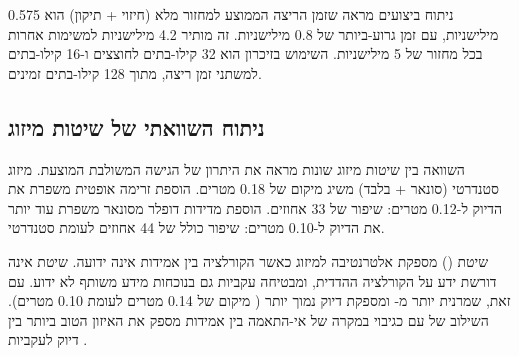 ניתוח ביצועים מראה שזמן הריצה הממוצע למחזור  מלא (חיזוי + תיקון) הוא 0.575 מילישניות, עם זמן גרוע-ביותר של 0.8 מילישניות. זה מותיר 4.2 מילישניות למשימות אחרות בכל מחזור  של 5 מילישניות. השימוש בזיכרון הוא 32 קילו-בתים לחוצצים ו-16 קילו-בתים למשתני זמן ריצה, מתוך 128 קילו-בתים זמינים.

\subsection{ניתוח השוואתי של שיטות מיזוג}
\label{sec:ch06_comparative_fusion}

השוואה בין שיטות מיזוג שונות מראה את היתרון של הגישה המשולבת המוצעת. מיזוג  סטנדרטי (סונאר +  בלבד) משיג  מיקום של 0.18 מטרים. הוספת זרימה אופטית משפרת את הדיוק ל-0.12 מטרים: שיפור של 33 אחוזים. הוספת מדידות דופלר מסונאר משפרת עוד יותר את הדיוק ל-0.10 מטרים: שיפור כולל של 44 אחוזים לעומת  סטנדרטי.

שיטת  () \cite{Julier1997CovarianceIntersection} מספקת אלטרנטיבה למיזוג כאשר הקורלציה בין אמידות אינה ידועה. שיטת  אינה דורשת ידע על הקורלציה ההדדית, ומבטיחה עקביות גם בנוכחות מידע משותף לא ידוע. עם זאת,  שמרנית יותר מ- ומספקת דיוק נמוך יותר ( מיקום של 0.14 מטרים לעומת 0.10 מטרים). השילוב של  עם  כגיבוי במקרה של אי-התאמה בין אמידות מספק את האיזון הטוב ביותר בין דיוק לעקביות \cite{MossEcholocation, Chen2020BioSonar, Thrun2005ProbRobotics, Julier1997CovarianceIntersection, Dissanayake2001SLAM}.
